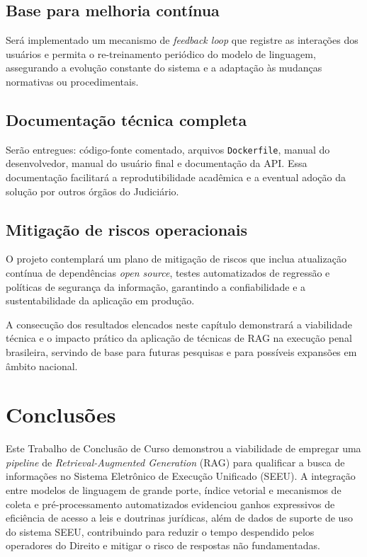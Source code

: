 \section{Base para melhoria contínua}
Será implementado um mecanismo de \emph{feedback loop} que registre as interações dos usuários e permita o re-treinamento periódico do modelo de linguagem, assegurando a evolução constante do sistema e a adaptação às mudanças normativas ou procedimentais.

\section{Documentação técnica completa}
Serão entregues: código-fonte comentado, arquivos \texttt{Dockerfile}, manual do desenvolvedor, manual do usuário final e documentação da API. Essa documentação facilitará a reprodutibilidade acadêmica e a eventual adoção da solução por outros órgãos do Judiciário.

\section{Mitigação de riscos operacionais}
O projeto contemplará um plano de mitigação de riscos que inclua atualização contínua de dependências \emph{open source}, testes automatizados de regressão e políticas de segurança da informação, garantindo a confiabilidade e a sustentabilidade da aplicação em produção.

A consecução dos resultados elencados neste capítulo demonstrará a viabilidade técnica e o impacto prático da aplicação de técnicas de RAG na execução penal brasileira, servindo de base para futuras pesquisas e para possíveis expansões em âmbito nacional.


\chapter{Conclusões}
\label{chap:conclusoes}

Este Trabalho de Conclusão de Curso demonstrou a viabilidade de empregar uma \textit{pipeline} de \textit{Retrieval-Augmented Generation} (RAG) para qualificar a busca de informações no Sistema Eletrônico de Execução Unificado (SEEU). A integração entre modelos de linguagem de grande porte, índice vetorial e mecanismos de coleta e pré-processamento automatizados evidenciou ganhos expressivos de eficiência de acesso a leis e doutrinas jurídicas, além de dados de suporte de uso do sistema SEEU, contribuindo para reduzir o tempo despendido pelos operadores do Direito e mitigar o risco de respostas não fundamentadas.

